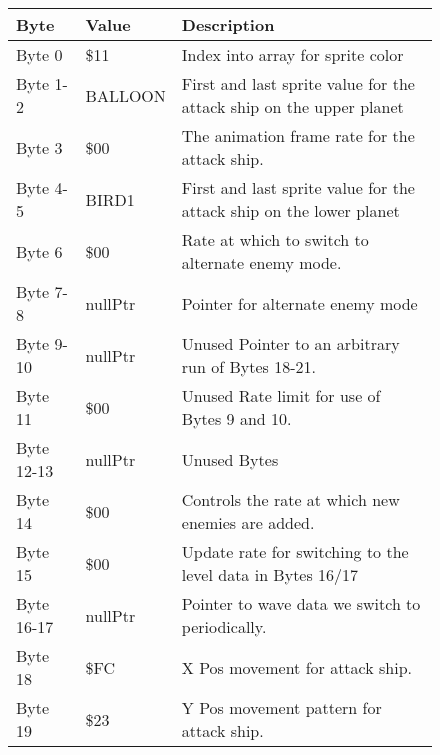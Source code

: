 \begin{figure}[H]
  {
  \setlength{\tabcolsep}{3.0pt}
  \setlength\cmidrulewidth{\heavyrulewidth} %
  \begin{adjustbox}{width=12cm}

\begin{tabular}{lll}
\toprule
 Byte       & Value                     & Description                                                         \\
\midrule
 Byte 0     & \$11                       & Index into array for sprite color                                   \\
 Byte 1-2   & BALLOON                   & First and last sprite value for the attack ship on the upper planet \\
 Byte 3     & \$00                       & The animation frame rate for the attack ship.                       \\
 Byte 4-5   & BIRD1                     & First and last sprite value for the attack ship on the lower planet \\
 Byte 6     & \$00                       & Rate at which to switch to alternate enemy mode.                    \\
 Byte 7-8   & nullPtr                   & Pointer for alternate enemy mode                                    \\
 Byte 9-10  & nullPtr                   & Unused Pointer to an arbitrary run of Bytes 18-21.                  \\
 Byte 11    & \$00                       & Unused Rate limit for use of Bytes 9 and 10.                        \\
 Byte 12-13 & nullPtr                   & Unused Bytes                                                        \\
 Byte 14    & \$00                       & Controls the rate at which new enemies are added.                   \\
 Byte 15    & \$00                       & Update rate for switching to the level data in Bytes 16/17          \\
 Byte 16-17 & nullPtr                   & Pointer to wave data we switch to periodically.                     \\
 Byte 18    & \$FC                       & X Pos movement for attack ship.                                     \\
 Byte 19    & \$23                       & Y Pos movement pattern for attack ship.                             \\

\end{tabular}
\end{adjustbox}}
\end{figure}
